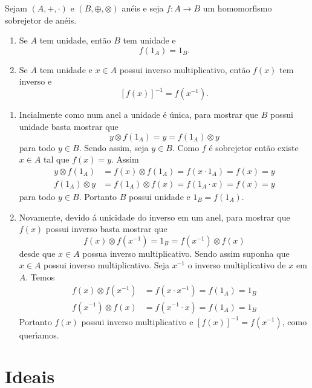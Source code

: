\begin{proposicao}
	Sejam $(A, +, \cdot)$ e $(B, \oplus, \otimes)$ an\'eis e seja $f : A \to B$ um homomorfismo sobrejetor de an\'eis.
	\begin{enumerate}[label={\roman*})]
		\item Se $A$ tem unidade, ent\~ao $B$ tem unidade e
		\[
			f(1_A) = 1_B.
		\]
		\item Se $A$ tem unidade e $x \in A$ possui inverso multiplicativo, ent\~ao $f(x)$ tem inverso e
		\[
			[f(x)]^{-1} = f(x^{-1}).
		\]
	\end{enumerate}
\end{proposicao}
\begin{prova}
	\begin{enumerate}[label={\roman*})]
		\item Incialmente como num anel a unidade \'e \'unica, para mostrar que $B$ possui unidade basta mostrar que
		\[
			y\otimes f(1_A) = y = f(1_A)\otimes y
		\]
		para todo $y \in B$. Sendo assim, seja $y \in B$. Como $f$ \'e sobrejetor ent\~ao existe $x \in A$ tal que $f(x) = y$. Assim
		\begin{align*}
			y\otimes f(1_A) &= f(x) \otimes f(1_A) = f(x\cdot 1_A) = f(x) = y\\
			f(1_A)\otimes y &= f(1_A) \otimes f(x) = f(1_A\cdot x) = f(x) = y
		\end{align*}
		para todo $y \in B$. Portanto $B$ possui unidade e $1_B = f(1_A)$.

		\item Novamente, devido \'a unicidade do inverso em um anel, para mostrar que $f(x)$ possui inverso basta mostrar que
		\[
			f(x)\otimes f(x^{-1}) = 1_B = f(x^{-1})\otimes f(x)
		\]
		desde que $x \in A$ possua inverso multiplicativo. Sendo assim suponha que $x \in A$ possui inverso multiplicativo. Seja $x^{-1}$ o inverso multiplicativo de $x$ em $A$. Temos
		\begin{align*}
			f(x)\otimes f(x^{-1}) &= f(x\cdot x^{-1}) = f(1_A) = 1_B\\
			f(x^{-1})\otimes f(x) &= f(x^{-1}\cdot x) = f(1_A) = 1_B
		\end{align*}
		Portanto $f(x)$ possui inverso multiplicativo e $[f(x)]^{-1} = f(x^{-1})$, como quer{\'\i}amos.
	\end{enumerate}
\end{prova}

\section{Ideais} %
\label{sec:ideais}

